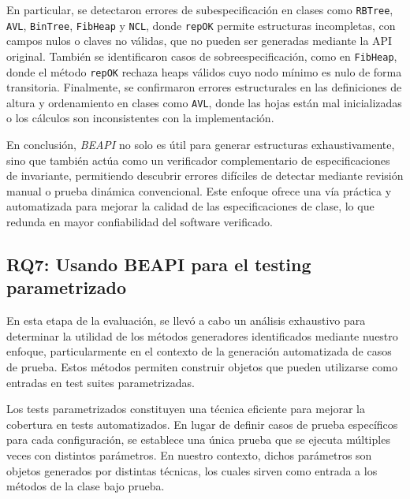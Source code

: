 En particular, se detectaron errores de subespecificación en clases como \texttt{RBTree}, \texttt{AVL}, 
\texttt{BinTree}, \texttt{FibHeap} y \texttt{NCL}, donde \texttt{repOK} permite estructuras 
incompletas, con campos nulos o claves no válidas, que no pueden ser generadas mediante la API 
original. También se identificaron casos de sobreespecificación, como en \texttt{FibHeap}, donde 
el método \texttt{repOK} rechaza heaps válidos cuyo nodo mínimo es nulo de forma transitoria. 
Finalmente, se confirmaron errores estructurales en las definiciones de altura y ordenamiento en 
clases como \texttt{AVL}, donde las hojas están mal inicializadas o los cálculos son inconsistentes 
con la implementación.

En conclusión, \emph{BEAPI} no solo es útil para generar estructuras exhaustivamente, sino que 
también actúa como un verificador complementario de especificaciones de invariante, permitiendo 
descubrir errores difíciles de detectar mediante revisión manual o prueba dinámica convencional. 
Este enfoque ofrece una vía práctica y automatizada para mejorar la calidad de las especificaciones 
de clase, lo que redunda en mayor confiabilidad del software verificado.



\subsection{RQ7: Usando BEAPI para el testing parametrizado}

En esta etapa de la evaluación, se llevó a cabo un análisis exhaustivo para determinar la 
utilidad de los métodos generadores identificados mediante nuestro enfoque, particularmente 
en el contexto de la generación automatizada de casos de prueba. Estos métodos permiten construir 
objetos que pueden utilizarse como entradas en test suites parametrizadas.

Los tests parametrizados constituyen una técnica eficiente para mejorar la cobertura en tests 
automatizados. En lugar de definir casos de prueba específicos para cada configuración, se 
establece una única prueba que se ejecuta múltiples veces con distintos parámetros. En nuestro 
contexto, dichos parámetros son objetos generados por distintas técnicas, los cuales sirven como 
entrada a los métodos de la clase bajo prueba.

